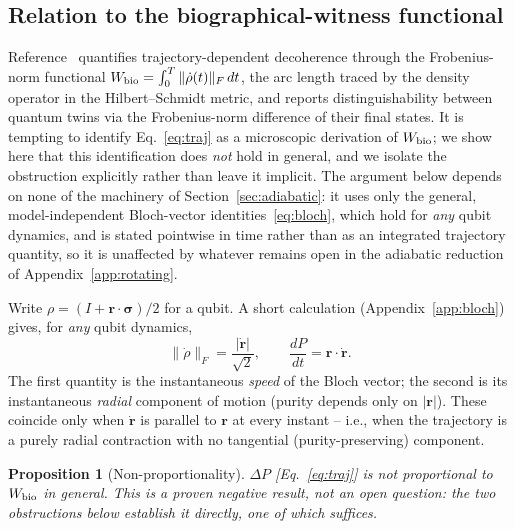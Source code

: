 \documentclass[aps,pra,reprint,superscriptaddress,nofootinbib,longbibliography]{revtex4-2}
\newtheorem{proposition}[theorem]{Proposition}
\newcommand{\Wbio}{W_{\rm bio}}
\begin{document}
\subsection{Relation to the biographical-witness functional}
\label{sec:bridge}

Reference~\cite{rodrigues2025} quantifies trajectory-dependent
decoherence through the Frobenius-norm functional
$\Wbio=\int_0^T\|\dot\rho(t)\|_F\,dt$, the arc length traced by the
density operator in the Hilbert--Schmidt metric, and reports
distinguishability between quantum twins via the Frobenius-norm
difference of their final states. It is tempting to identify
Eq.~\eqref{eq:traj} as a microscopic derivation of $\Wbio$; we show
here that this identification does \emph{not} hold in general, and we
isolate the obstruction explicitly rather than leave it implicit. The
argument below depends on none of the machinery of
Section~\ref{sec:adiabatic}: it uses only the general, model-independent
Bloch-vector identities~\eqref{eq:bloch}, which hold for \emph{any}
qubit dynamics, and is stated pointwise in time rather than as an
integrated trajectory quantity, so it is unaffected by whatever
remains open in the adiabatic reduction of Appendix~\ref{app:rotating}.

Write $\rho=(I+\mathbf r\cdot\boldsymbol\sigma)/2$ for a qubit. A short
calculation (Appendix~\ref{app:bloch}) gives, for \emph{any} qubit
dynamics,
\begin{equation}
\|\dot\rho\|_F = \frac{|\dot{\mathbf r}|}{\sqrt2},
\qquad
\frac{dP}{dt} = \mathbf r\cdot\dot{\mathbf r}.
\label{eq:bloch}
\end{equation}
The first quantity is the instantaneous \emph{speed} of the Bloch
vector; the second is its instantaneous \emph{radial} component of
motion (purity depends only on $|\mathbf r|$). These coincide only
when $\dot{\mathbf r}$ is parallel to $\mathbf r$ at every instant --
i.e., when the trajectory is a purely radial contraction with no
tangential (purity-preserving) component.

\begin{proposition}[Non-proportionality]
\label{prop:bridge}
$\Delta P$ [Eq.~\eqref{eq:traj}] is not proportional to $\Wbio$ in
general. This is a proven negative result, not an open question: the
two obstructions below establish it directly, one of which suffices.
\end{proposition}
\end{document}
